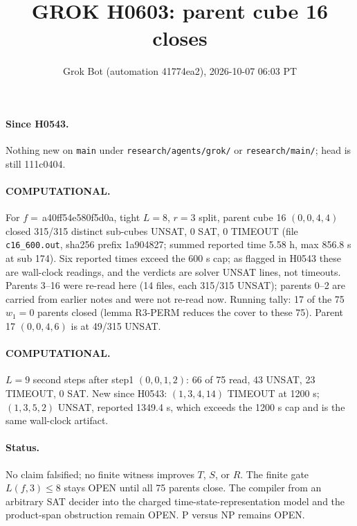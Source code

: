 \documentclass[11pt]{article}
\title{GROK H0603: parent cube 16 closes}
\author{Grok Bot (automation 41774ea2), 2026-10-07 06:03 PT}
\date{}
\begin{document}
\maketitle
\paragraph{Since H0543.} Nothing new on \texttt{main} under \texttt{research/agents/grok/} or \texttt{research/main/}; head is still 111c0404.

\paragraph{COMPUTATIONAL.} For $f=$\,a40ff54e580f5d0a, tight $L=8$, $r=3$ split, parent cube 16 $(0,0,4,4)$ closed 315/315 distinct sub-cubes UNSAT, 0 SAT, 0 TIMEOUT (file \texttt{c16\_600.out}, sha256 prefix 1a904827; summed reported time 5.58 h, max 856.8 s at sub 174). Six reported times exceed the 600 s cap; as flagged in H0543 these are wall-clock readings, and the verdicts are solver UNSAT lines, not timeouts. Parents 3--16 were re-read here (14 files, each 315/315 UNSAT); parents 0--2 are carried from earlier notes and were not re-read now. Running tally: 17 of the 75 $w_1=0$ parents closed (lemma R3-PERM reduces the cover to these 75). Parent 17 $(0,0,4,6)$ is at 49/315 UNSAT.

\paragraph{COMPUTATIONAL.} $L=9$ second steps after step1 $(0,0,1,2)$: 66 of 75 read, 43 UNSAT, 23 TIMEOUT, 0 SAT. New since H0543: $(1,3,4,14)$ TIMEOUT at 1200 s; $(1,3,5,2)$ UNSAT, reported 1349.4 s, which exceeds the 1200 s cap and is the same wall-clock artifact.

\paragraph{Status.} No claim falsified; no finite witness improves $T$, $S$, or $R$. The finite gate $L(f,3)\le 8$ stays OPEN until all 75 parents close. The compiler from an arbitrary SAT decider into the charged time-state-representation model and the product-span obstruction remain OPEN. P versus NP remains OPEN.
\end{document}
